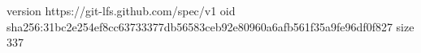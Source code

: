version https://git-lfs.github.com/spec/v1
oid sha256:31bc2e254ef8cc63733377db56583ceb92e80960a6afb561f35a9fe96df0f827
size 337
